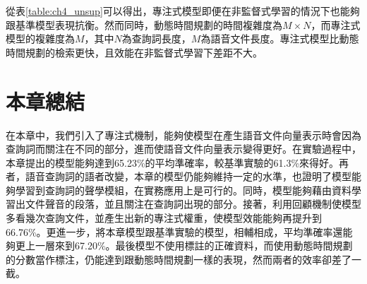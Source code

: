 從表\ref{table:ch4_unsup}可以得出，專注式模型即便在非監督式學習的情況下也能夠跟基準模型表現抗衡。然而同時，動態時間規劃的時間複雜度為$M\times
N$，而專注式模型的複雜度為$M$，其中$N$為查詢詞長度，$M$為語音文件長度。專注式模型比動態時間規劃的檢索更快，且效能在非監督式學習下差距不大。
\section{本章總結}
在本章中，我們引入了專注式機制，能夠使模型在產生語音文件向量表示時會因為查詢詞而關注在不同的部分，進而使語音文件向量表示變得更好。在實驗過程中，本章提出的模型能夠達到65.23\%的平均準確率，較基準實驗的61.3\%來得好。再者，語音查詢詞的語者改變，本章的模型仍能夠維持一定的水準，也證明了模型能夠學習到查詢詞的聲學模組，在實務應用上是可行的。同時，模型能夠藉由資料學習出文件聲音的段落，並且關注在查詢詞出現的部分。接著，利用回顧機制使模型多看幾次查詢文件，並產生出新的專注式權重，使模型效能能夠再提升到66.76\%。更進一步，將本章模型跟基準實驗的模型，相輔相成，平均準確率還能夠更上一層來到67.20\%。最後模型不使用標註的正確資料，而使用動態時間規劃的分數當作標注，仍能達到跟動態時間規劃一樣的表現，然而兩者的效率卻差了一截。



